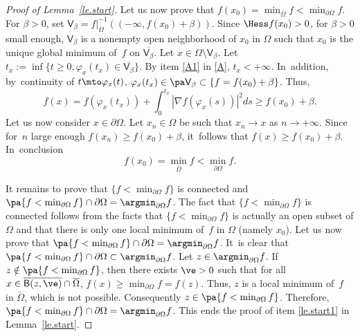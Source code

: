\begin{proof}[Proof of Lemma~\ref{le.start}]
Let us now prove that $f(x_0)=\min_{\overline \Omega}f<\min_{\partial \Omega}f$. For $\beta >0$, set $\mathsf V_\beta=f|_{\Omega}^{-1}((-\infty,f(x_0)+ \beta))$. Since $\Hess f(x_0)>0$, for $\beta>0$ small enough,
$\mathsf V_\beta$ is a nonempty open neighborhood of $x_0$ in $\Omega$ such that
$x_0$ is the unique global minimum of~$f$ on $ \overline{\mathsf V_\beta}$.
Let $x\in \Omega\setminus {\mathsf V_\beta}$. Let $t_x:=\inf\{t\ge 0, \varphi_x(t_x)\in \overline{\mathsf V_\beta}\}$.
By item \eqref{A1} in \ref{A}, $t_x<+\infty$. In~addition, by~continuity of $t\mto \varphi_x(t)$, $\varphi_x(t_x)\in \pa \mathsf V_\beta\subset \{f=f(x_0)+\beta\}$. Thus,
\[
f(x) =f(\varphi_x({t_x})) + \int_0^{t_x} |\nabla f(\varphi_x(s))|^2ds \ge f(x_0)+\beta.
\]
Let us now consider $x\in \partial \Omega$. Let $x_n\in \Omega$ be such that $x_n\to x$ as $n\to +\infty$. Since for~$n$ large enough $f(x_n)\ge f(x_0)+\beta$, it~follows that $f(x)\ge f(x_0)+\beta$. In~conclusion
\[
f(x_0)=\min_{\overline \Omega}f<\min_{\partial \Omega}f.
\]

It remains to prove that
$\{f< \min_{\partial \Omega}f\}$ is connected and $\pa \{f< \min_{\partial \Omega}f\}\cap \partial \Omega =\argmin_{\partial \Omega}f$. The fact that $\{f< \min_{\partial \Omega}f\}$ is connected follows from the facts that $\{f< \min_{\partial \Omega}f\}$ is actually an open subset of $\Omega$ and that there is only one local minimum of~$f$ in $\Omega$ (namely $x_0$). Let us now prove that $\pa \{f< \min_{\partial \Omega}f\}\cap \partial \Omega =\argmin_{\partial \Omega}f$. It~is clear that $\pa \{f< \min_{\partial \Omega}f\}\cap \partial \Omega \subset \argmin_{\partial \Omega}f$. Let $z\in \argmin_{\partial \Omega}f$. If~$z\notin \pa \{f< \min_{\partial \Omega}f\}$, then there exists $\ve >0$ such that for all $x\in \overline{\mathsf B(z,\ve)}\cap \overline{\Omega}$, $f(x)\ge \min_{\partial \Omega}f=f(z)$. Thus, $z$ is a local minimum of~$f$ in $\overline \Omega$, which is not possible. Consequently $z\in \pa \{f< \min_{\partial \Omega}f\}$. Therefore, $\pa \{f< \min_{\partial \Omega}f\}\cap \partial \Omega =\argmin_{\partial \Omega}f$. This ends the proof of item \eqref{le.start1} in Lemma~\ref{le.start}.


\end{proof}

